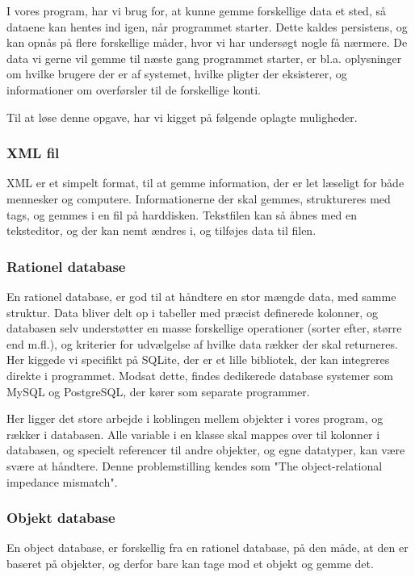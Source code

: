 I vores program, har vi brug for, at kunne gemme forskellige data et sted, så dataene kan hentes ind igen, når programmet starter. Dette kaldes persistens, og kan opnås på flere forskellige måder, hvor vi har undersøgt nogle få nærmere.
De data vi gerne vil gemme til næste gang programmet starter, er bl.a. oplysninger om hvilke brugere der er af systemet, hvilke pligter der eksisterer, og informationer om overførsler til de forskellige konti.

Til at løse denne opgave, har vi kigget på følgende oplagte muligheder.

\subsubsection{XML fil}
XML er et simpelt format, til at gemme information, der er let læseligt for både mennesker og computere. Informationerne der skal gemmes, struktureres med tags, og gemmes i en fil på harddisken. Tekstfilen kan så åbnes med en teksteditor, og der kan nemt ændres i, og tilføjes data til filen.


\subsubsection{Rationel database}
En rationel database, er god til at håndtere en stor mængde data, med samme struktur. Data bliver delt op i tabeller med præcist definerede kolonner, og databasen selv understøtter en masse forskellige operationer (sorter efter, større end m.fl.), og kriterier for udvælgelse af hvilke data rækker der skal returneres. Her kiggede vi specifikt på SQLite, der er et lille bibliotek, der kan integreres direkte i programmet. Modsat dette, findes dedikerede database systemer som MySQL og PostgreSQL, der kører som separate programmer.

Her ligger det store arbejde i koblingen mellem objekter i vores program, og rækker i databasen. Alle variable i en klasse skal mappes over til kolonner i databasen, og specielt referencer til andre objekter, og egne datatyper, kan være svære at håndtere. Denne problemstilling kendes som "The object-relational impedance mismatch". %

\subsubsection{Objekt database}
En object database,  er forskellig fra en rationel database, på den måde, at den er baseret på objekter, og derfor bare kan tage mod et objekt og gemme det.

